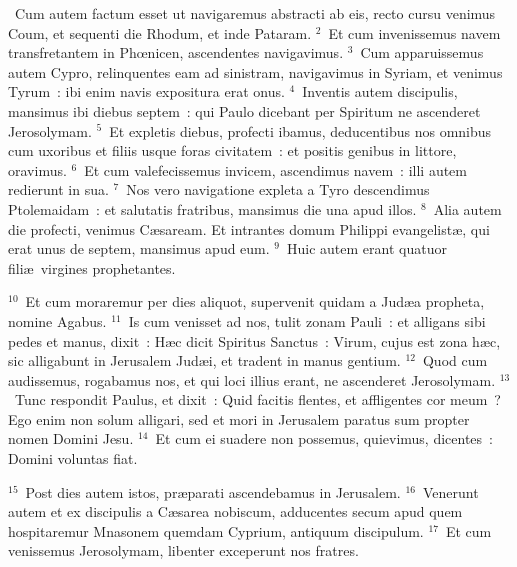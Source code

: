 ~\lettrine[lines=10,image=true,loversize=0.05,lraise=-0.03]{C}{}um autem factum esset ut navigaremus abstracti ab eis, recto cursu venimus Coum, et sequenti die Rhodum, et inde Pataram.
${}^{2}$~Et cum invenissemus navem transfretantem in Phœnicen, ascendentes navigavimus.
${}^{3}$~Cum apparuissemus autem Cypro, relinquentes eam ad sinistram, navigavimus in Syriam, et venimus Tyrum~: ibi enim navis expositura erat onus.
${}^{4}$~Inventis autem discipulis, mansimus ibi diebus septem~: qui Paulo dicebant per Spiritum ne ascenderet Jerosolymam.
${}^{5}$~Et expletis diebus, profecti ibamus, deducentibus nos omnibus cum uxoribus et filiis usque foras civitatem~: et positis genibus in littore, oravimus.
${}^{6}$~Et cum valefecissemus invicem, ascendimus navem~: illi autem redierunt in sua.
${}^{7}$~Nos vero navigatione expleta a Tyro descendimus Ptolemaidam~: et salutatis fratribus, mansimus die una apud illos.
${}^{8}$~Alia autem die profecti, venimus C\ae saream. Et intrantes domum Philippi evangelist\ae , qui erat unus de septem, mansimus apud eum.
${}^{9}$~Huic autem erant quatuor fili\ae\ virgines prophetantes.


${}^{10}$~Et cum moraremur per dies aliquot, supervenit quidam a Jud\ae a propheta, nomine Agabus.
${}^{11}$~Is cum venisset ad nos, tulit zonam Pauli~: et alligans sibi pedes et manus, dixit~: H\ae c dicit Spiritus Sanctus~: Virum, cujus est zona h\ae c, sic alligabunt in Jerusalem Jud\ae i, et tradent in manus gentium.
${}^{12}$~Quod cum audissemus, rogabamus nos, et qui loci illius erant, ne ascenderet Jerosolymam.
${}^{13}$~Tunc respondit Paulus, et dixit~: Quid facitis flentes, et affligentes cor meum~? Ego enim non solum alligari, sed et mori in Jerusalem paratus sum propter nomen Domini Jesu.
${}^{14}$~Et cum ei suadere non possemus, quievimus, dicentes~: Domini voluntas fiat.


${}^{15}$~Post dies autem istos, pr\ae parati ascendebamus in Jerusalem.
${}^{16}$~Venerunt autem et ex discipulis a C\ae sarea nobiscum, adducentes secum apud quem hospitaremur Mnasonem quemdam Cyprium, antiquum discipulum.
${}^{17}$~Et cum venissemus Jerosolymam, libenter exceperunt nos fratres.


